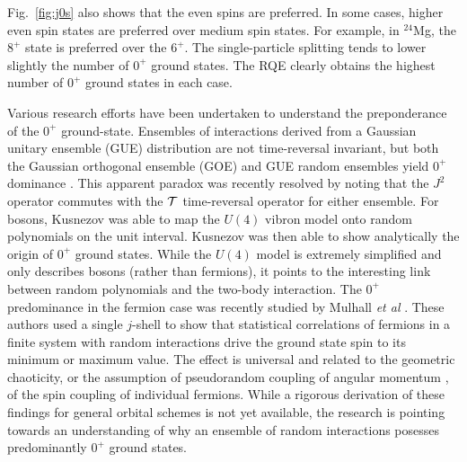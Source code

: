 \documentclass[rmp,aps,floatfix]{revtex4}
\begin{document}
Fig.~\ref{fig:j0s} also shows that the even spins are preferred. 
In some cases, higher even spin states are preferred over medium
spin states. For example, in $^{24}$Mg, the $8^+$ state is preferred
over the $6^+$. The single-particle splitting tends to lower slightly
the number of $0^+$ ground states. The RQE clearly obtains the highest
number of $0^+$ ground states in each case. 

Various research efforts have been undertaken to 
understand the preponderance of the $0^+$ ground-state. 
Ensembles of interactions derived from a Gaussian unitary ensemble (GUE) 
distribution are not
time-reversal invariant, but both the Gaussian orthogonal ensemble (GOE) 
and GUE random ensembles 
yield $0^+$ dominance \cite{bijker99}. This apparent paradox was recently
resolved \cite{vz02} by noting that the $J^2$ operator commutes with 
the ${\cal T}$ time-reversal operator for either ensemble. 
For bosons, Kusnezov \cite{kus00} was able to map the $U(4)$ vibron
model onto random polynomials on the unit interval. 
Kusnezov was then able to show analytically the origin of $0^+$ ground
states. While the $U(4)$ model is extremely simplified and only describes
bosons (rather than fermions),  it points to the 
interesting link between random polynomials and the two-body interaction. 
The $0^+$ predominance in the fermion case was recently studied by 
Mulhall {\em et al} \cite{mulhall00}. These authors used  
a single $j$-shell to show that statistical 
correlations of fermions in a finite system with random interactions 
drive the ground state spin to its minimum or 
maximum value. The effect is universal and related to the 
geometric chaoticity, or the assumption of pseudorandom coupling 
of angular momentum \cite{volodya1996}, 
of the spin coupling of 
individual fermions. While a rigorous derivation of these findings for 
general orbital schemes is not yet available, the research is pointing towards
an understanding of why an ensemble of 
random interactions posesses predominantly $0^+$ ground states. 
\end{document}
